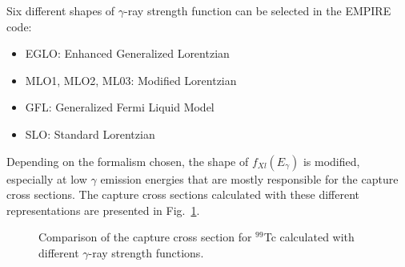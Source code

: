\documentclass[twocolumn,amsmath,amssymb,10pt,groupedaddress,a4paper]{revtex4}
\begin{document}
Six different
shapes of $\gamma$-ray strength function can be selected in the EMPIRE code:
\begin{itemize}
\item  EGLO: Enhanced Generalized Lorentzian~\cite{kop01}
\item  MLO1, MLO2, ML03: Modified Lorentzian~\cite{plu01,plu02,plu03}
\item  GFL: Generalized Fermi Liquid Model~\cite{mug01}
\item  SLO: Standard Lorentzian~\cite{bri01}
\end{itemize}
Depending on the formalism chosen, the shape of $f_{Xl}(E_{\gamma})$ is modified, especially at low $\gamma$ emission
 energies that are mostly responsible for the capture cross sections. The capture cross sections calculated
with these different representations are presented in Fig.~\ref{unresolved01}.
\begin{figure}[htbp]
\caption{Comparison of the capture cross section for $^{99}$Tc calculated with
different $\gamma$-ray strength functions.}
\label{unresolved01}
\end{figure}



\end{document}
